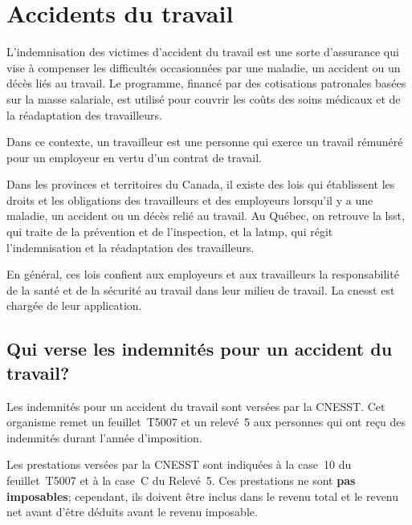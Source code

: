 \section{Accidents du travail}
\begin{intro}
	L'indemnisation des victimes d'accident du travail est une sorte d'assurance qui vise à compenser les difficultés occasionnées par une maladie, un accident ou un décès liés au travail. Le programme, financé par des cotisations patronales basées sur la masse salariale, est utilisé pour couvrir les coûts des soins médicaux et de la réadaptation des travailleurs.
\end{intro}

Dans ce contexte, un \og travailleur \fg{} est une personne qui exerce un travail rémunéré pour un employeur en vertu d'un contrat de travail.

Dans les provinces et territoires du Canada, il existe des lois qui établissent les droits et les obligations des travailleurs et des employeurs lorsqu'il y a une maladie, un accident ou un décès relié au travail. Au Québec, on retrouve la \acrfull{lsst}, qui traite de la prévention et de l'inspection, et la \acrfull{latmp}, qui régit l'indemnisation et la réadaptation des travailleurs.

En général, ces lois confient aux employeurs et aux travailleurs la responsabilité de la santé et de la sécurité au travail dans leur milieu de travail. La \acrfull{cnesst} est chargée de leur application. 


\subsection{Qui verse les indemnités pour un accident du travail?}
Les indemnités pour un accident du travail sont versées par la CNESST. Cet organisme remet un feuillet~T5007 et un relevé~5 aux personnes qui ont reçu des indemnités durant l'année d'imposition.

Les prestations versées par la CNESST sont indiquées à la case~10 du feuillet~T5007 et à la case~C du Relevé~5. Ces prestations ne sont \textbf{pas imposables}; cependant, ils doivent être inclus dans le revenu total et le revenu net avant d'être déduits avant le revenu imposable.

